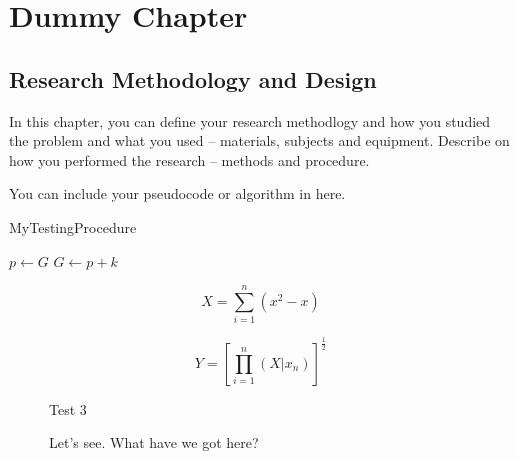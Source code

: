 \chapter{Dummy Chapter}

\section{Research Methodology and Design}
In this chapter, you can define your research methodlogy and how you studied the problem and what you used – materials, subjects and equipment. Describe on how you performed the research – methods and procedure. 

You can include your pseudocode or algorithm in here.

\begin{algorithm}
\caption{MyTestingProcedure}
\begin{algorithmic}[1]
\State $p\gets G$
\Else
{}
\State $G\gets p+k$
\EndIf
\EndIf
\EndProcedure
\end{algorithmic}
\end{algorithm}

\begin{equation*}
X = \sum_{i=1}^n (x^2-x)
\end{equation*}

\begin{equation*}
Y = \left[\prod_{i=1}^n (X|x_n) \right]^{\frac{1}{2}}
\end{equation*}

\begin{quotation}
\lipsum[1-2]
\end{quotation}

\begin{figure}[hbt!]
\centering Test 3
\caption{Let's see. What have we got here?}
\end{figure}
